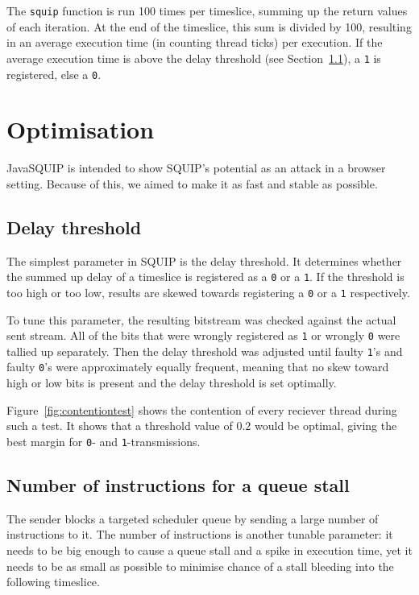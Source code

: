 \documentclass[11pt,
  titlepage=false,
]{scrreprt}
\begin{document}
The \texttt{squip} function is run 100 times per timeslice, summing up the return values of each iteration.
At the end of the timeslice, this sum is divided by 100, resulting in an average execution time
(in counting thread ticks) per execution.
If the average execution time is above the delay threshold (see Section~\ref{subsec:delaythreshold}), a \texttt{1} is registered, else a \texttt{0}.

\section{Optimisation}
JavaSQUIP is intended to show SQUIP's potential as an attack in a browser setting.
Because of this, we aimed to make it as fast and stable as possible.

\subsection{Delay threshold}
\label{subsec:delaythreshold}
The simplest parameter in SQUIP is the delay threshold.
It determines whether the summed up delay of a timeslice is registered as a \texttt{0} or a \texttt{1}.
If the threshold is too high or too low, results are skewed towards registering a \texttt{0} or a \texttt{1} respectively.

To tune this parameter, the resulting bitstream was checked against the actual sent stream.
All of the bits that were wrongly registered as \texttt{1} or wrongly \texttt{0} were tallied up separately.
Then the delay threshold was adjusted until faulty \texttt{1}'s and faulty \texttt{0}'s were approximately equally frequent,
meaning that no skew toward high or low bits is present and the delay threshold is set optimally.

Figure~\ref{fig:contentiontest} shows the contention of every reciever thread during such a test.
It shows that a threshold value of $0.2$ would be optimal, giving the best margin for \texttt{0}- and \texttt{1}-transmissions.


\subsection{Number of instructions for a queue stall}
The sender blocks a targeted scheduler queue by sending a large number of instructions to it.
The number of instructions is another tunable parameter:
it needs to be big enough to cause a queue stall and a spike in execution time,
yet it needs to be as small as possible to minimise chance of a stall bleeding into the following timeslice.
\end{document}
